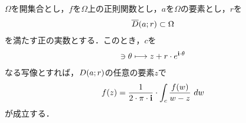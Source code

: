 	\begin{screen}
		\begin{thm}[円周上の積分公式]\label{thm:integral_formula_on_a_circle}
			$\Omega$を開集合とし，$f$を$\Omega$上の正則関数とし，$a$を$\Omega$の要素とし，$r$を
			\begin{align}
				\overline{D}(a;r) \subset \Omega
			\end{align}
			を満たす正の実数とする．このとき，$c$を
			\begin{align}
				[0,2 \cdot \pi] \ni \theta \longmapsto z + r \cdot e^{\isym \cdot \theta}
			\end{align}
			なる写像とすれば，$D(a;r)$の任意の要素$z$で
			\begin{align}
				f(z) = \frac{1}{2 \cdot \pi \cdot \mathbf{i}} \cdot \int_{c} \frac{f(w)}{w - z}\ dw
			\end{align}
			が成立する．
		\end{thm}
	\end{screen}
	
